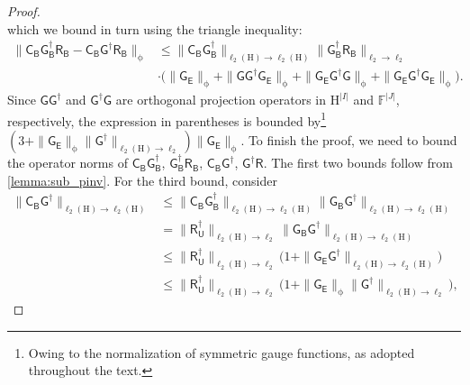 \documentclass[onefignum,onetabnum]{siamart250211}
\newcommand{\F}{\mathbb{F}}
\newcommand{\Hilb}{\mathrm{H}}
\newcommand{\Batrix}[1]{\bm{\Matrix{#1}}}
\newcommand{\Matrix}[1]{\mathsf{#1}}
\newcommand{\pinv}{\dagger}
\newcommand{\Index}[1]{{#1}}
\newcommand{\Norm}[3][]{#1\| #2 #1\|_{\mathrm{#3}}}
\begin{document}
\begin{proof}
\begin{equation}
\end{equation}
which we bound in turn using the triangle inequality:
\begin{align*}
    \Norm{\Batrix{C}_{\Batrix{B}} \Batrix{G}_{\Batrix{B}}^\pinv \Batrix{R}_{\Batrix{B}} - \Batrix{C}_{\Batrix{B}} \Batrix{G}^\pinv \Batrix{R}_{\Batrix{B}}}{\phi} &\leq \Norm{\Batrix{C}_{\Batrix{B}} \Batrix{G}_{\Batrix{B}}^\pinv}{\ell_2(\Hilb) \to \ell_2(\Hilb)} \Norm{\Batrix{G}_{\Batrix{B}}^\pinv \Batrix{R}_{\Batrix{B}}}{\ell_2 \to \ell_2} \\
    &\cdot \big( \Norm{\Batrix{G}_{\Batrix{E}}}{\phi} + \Norm{\Batrix{G} \Batrix{G}^\pinv \Batrix{G}_{\Batrix{E}}}{\phi} + \Norm{\Batrix{G}_{\Batrix{E}} \Batrix{G}^\pinv \Batrix{G}}{\phi} + \Norm{\Batrix{G}_{\Batrix{E}} \Batrix{G}^\pinv \Batrix{G}_{\Batrix{E}}}{\phi} \big).
\end{align*}
Since $\Batrix{G} \Batrix{G}^\pinv$ and $\Batrix{G}^\pinv \Batrix{G}$ are orthogonal projection operators in $\Hilb^{|\Index{I}|}$ and $\F^{|\Index{J}|}$, respectively, the expression in parentheses is bounded by\footnote{Owing to the normalization of symmetric gauge functions, as adopted throughout the text.} $(3 + \Norm{\Batrix{G}_{\Batrix{E}}}{\phi} \Norm{\Batrix{G}^\pinv}{\ell_2(\Hilb) \to \ell_2}) \Norm{\Batrix{G}_{\Batrix{E}}}{\phi}$.
To finish the proof, we need to bound the operator norms of $\Batrix{C}_{\Batrix{B}} \Batrix{G}_{\Batrix{B}}^\pinv$, $\Batrix{G}_{\Batrix{B}}^\pinv \Batrix{R}_{\Batrix{B}}$, $\Batrix{C}_{\Batrix{B}} \Batrix{G}^\pinv$, $\Batrix{G}^\pinv \Batrix{R}$.
The first two bounds follow from \cref{lemma:sub_pinv}.
For the third bound, consider
\begin{align*}
    \Norm{\Batrix{C}_{\Batrix{B}} \Batrix{G}^\pinv}{\ell_2(\Hilb) \to \ell_2(\Hilb)} &\leq \Norm{\Batrix{C}_{\Batrix{B}} \Batrix{G}_{\Batrix{B}}^\pinv}{\ell_2(\Hilb) \to \ell_2(\Hilb)} \Norm{\Batrix{G}_{\Batrix{B}} \Batrix{G}^\pinv}{\ell_2(\Hilb) \to \ell_2(\Hilb)} \\
    &= \Norm{\Batrix{R}_{\Batrix{U}}^\pinv}{\ell_2(\Hilb) \to \ell_2} \Norm{\Batrix{G}_{\Batrix{B}} \Batrix{G}^\pinv}{\ell_2(\Hilb) \to \ell_2(\Hilb)} \\
    &\leq \Norm{\Batrix{R}_{\Batrix{U}}^\pinv}{\ell_2(\Hilb) \to \ell_2} \big(1 + \Norm{\Batrix{G}_{\Batrix{E}} \Batrix{G}^\pinv}{\ell_2(\Hilb) \to \ell_2(\Hilb)} \big) \\
    &\leq \Norm{\Batrix{R}_{\Batrix{U}}^\pinv}{\ell_2(\Hilb) \to \ell_2} \big(1 + \Norm{\Batrix{G}_{\Batrix{E}}}{\phi} \Norm{\Batrix{G}^\pinv}{\ell_2(\Hilb) \to \ell_2} \big),

\end{align*}
\end{proof}
\end{document}
